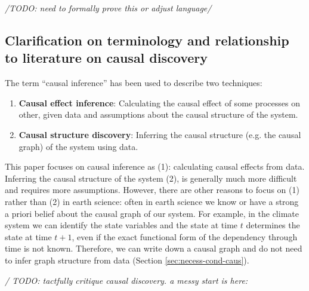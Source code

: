 \documentclass[12pt]{article}
\begin{document}
\textit{/TODO: need to formally prove this or adjust language/}

\subsection{Clarification on terminology and relationship to literature on causal discovery}
\label{sec:discovery}
The term ``causal inference'' has been used to describe two
techniques:

\begin{enumerate}
\item \textbf{Causal effect inference}: Calculating the causal effect
  of some processes on other, given data and assumptions about the
  causal structure of the system.
\item \textbf{Causal structure discovery}: Inferring the causal
  structure (e.g. the causal graph) of the system using data.
\end{enumerate}

This paper focuses on causal inference as (1): calculating causal
effects from data. Inferring the causal structure of the system (2),
is generally much more difficult and requires more
assumptions. However, there are other reasons to focus on (1) rather
than (2) in earth science: often in earth science we know or have a
strong a priori belief about the causal graph of our system. For
example, in the climate system we can identify the state variables and
the state at time \(t\) determines the state at time \(t+1\), even if
the exact functional form of the dependency through time is not
known. Therefore, we can write down a causal graph and do not need to
infer graph structure from data (Section \ref{sec:necess-cond-caus}).

\textit{/ TODO: tactfully critique causal discovery. a messy start is
  here:}
\end{document}
